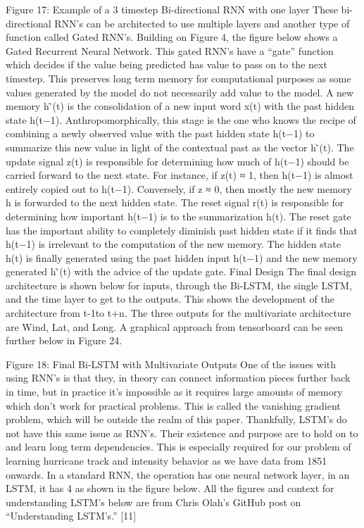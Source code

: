 \documentclass{article}
\begin{document}
Figure 17: Example of a 3 timestep Bi-directional RNN with one layer
These bi-directional RNN’s can be architected to use multiple layers and another type of function called Gated RNN’s. Building on Figure 4, the figure below shows a Gated Recurrent Neural Network. This gated RNN’s have a “gate” function which decides if the value being predicted has value to pass on to the next timestep. This preserves long term memory for computational purposes as some values generated by the model do not necessarily add value to the model. A new memory h ̃(t) is the consolidation of a new input word x(t) with the past hidden state h(t−1). Anthropomorphically, this stage is the one who knows the recipe of combining a newly observed value with the past hidden state h(t−1) to summarize this new value in light of the contextual past as the vector h ̃(t). The update signal z(t) is responsible for determining how much of h(t−1) should be carried forward to the next state. For instance, if z(t) ≈ 1, then h(t−1) is almost entirely copied out to h(t−1). Conversely, if z ≈ 0, then mostly the new memory h is forwarded to the next hidden state. The reset signal r(t) is responsible for determining how important h(t−1) is to the summarization h(t). The reset gate has the important ability to completely diminish past hidden state if it finds that h(t−1) is irrelevant to the computation of the new memory. The hidden state h(t) is finally generated using the past hidden input h(t−1) and the new memory generated h ̃(t) with the advice of the update gate. 
Final Design
The final design architecture is shown below for inputs, through the Bi-LSTM, the single LSTM, and the time layer to get to the outputs. This shows the development of the architecture from t-1to t+n. The three outputs for the multivariate architecture are Wind, Lat, and Long. A graphical approach from tensorboard can be seen further below in Figure 24.


Figure 18: Final Bi-LSTM with Multivariate Outputs
One of the issues with using RNN’s is that they, in theory can connect information pieces further back in time, but in practice it’s impossible as it requires large amounts of memory which don’t work for practical problems. This is called the vanishing gradient problem, which will be outside the realm of this paper. Thankfully, LSTM’s do not have this same issue as RNN’s. Their existence and purpose are to hold on to and learn long term dependencies. This is especially required for our problem of learning hurricane track and intensity behavior as we have data from 1851 onwards. In a standard RNN, the operation has one neural network layer, in an LSTM, it has 4 as shown in the figure below. All the figures and context for understanding LSTM’s below are from Chris Olah’s GitHub post on “Understanding LSTM’s.”  [11]
\end{document}
